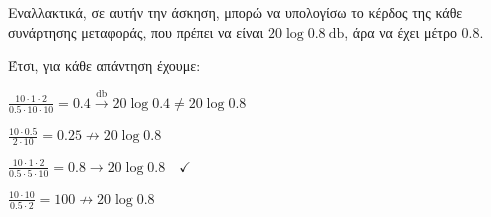 \documentclass[11pt,a4paper,notitlepage,fleqn,final]{article}
\begin{document}
\begin{exercise}
Εναλλακτικά, σε αυτήν την άσκηση, μπορώ να υπολογίσω το κέρδος της κάθε συνάρτησης
μεταφοράς, που πρέπει να είναι \( 20\log 0.8 \SI{}{\decibel} \), άρα να έχει μέτρο \( 0.8 \).

Έτσι, για κάθε απάντηση έχουμε:
\begin{enumgreekparen}
	\item \( \displaystyle \frac{10\cdot 1\cdot 2}{0.5\cdot 10 \cdot 10} 
	= 0.4 \xrightarrow{\si{\decibel}} 20\log 0.4 \neq 20\log 0.8 \)
	\item \( \displaystyle \frac{10\cdot 0.5}{2\cdot 10} = 0.25 \nrightarrow 20\log 0.8 \)
	\item \( \displaystyle \frac{10\cdot 1\cdot 2}{0.5\cdot 5\cdot 10} = 0.8
	\rightarrow 20\log 0.8 \quad \checkmark \)
	\item \( \displaystyle \frac{10\cdot 10}{0.5\cdot 2} = 100
	\nrightarrow 20\log 0.8 \)
\end{enumgreekparen}

\end{exercise}
\end{document}

